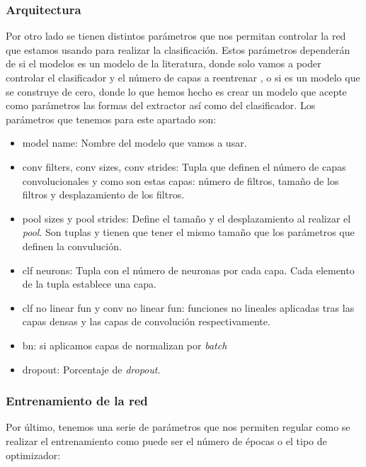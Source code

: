 \documentclass[a4paper,12pt,twoside,titlepage]{article}
\begin{document}
\subsubsection*{Arquitectura}

Por otro lado se tienen distintos parámetros que nos permitan controlar la red que estamos usando para realizar la clasificación. Estos parámetros dependerán de si el modelos es un modelo de la literatura, donde solo vamos a poder controlar el clasificador y el número de capas a reentrenar , o si es un modelo que se construye de cero, donde lo que hemos hecho es crear un modelo que acepte como parámetros las formas del extractor así como del clasificador. Los parámetros que tenemos para este apartado son:

\begin{itemize}
  \item model name: Nombre del modelo que vamos a usar.
  \item conv filters, conv sizes, conv strides: Tupla que definen el número de capas convolucionales y como son estas capas: número de filtros, tamaño de los filtros y desplazamiento de los filtros.
  \item pool sizes y pool strides: Define el tamaño y el desplazamiento al realizar el \textit{pool}. Son tuplas y tienen que tener el mismo tamaño que los parámetros que definen la convulución.
  \item clf neurons: Tupla con el número de neuronas por cada capa. Cada elemento de la tupla establece una capa.
  \item clf no linear fun y conv no linear fun: funciones no lineales aplicadas tras las capas densas y las capas de convolución respectivamente.
  \item bn: si aplicamos capas de normalizan por \textit{batch}
  \item dropout: Porcentaje de \textit{dropout}. 
\end{itemize}

\subsubsection*{Entrenamiento de la red}

Por último, tenemos una serie de parámetros que nos permiten regular como se realizar el entrenamiento como puede ser el número de épocas o el tipo de optimizador:
\end{document}
